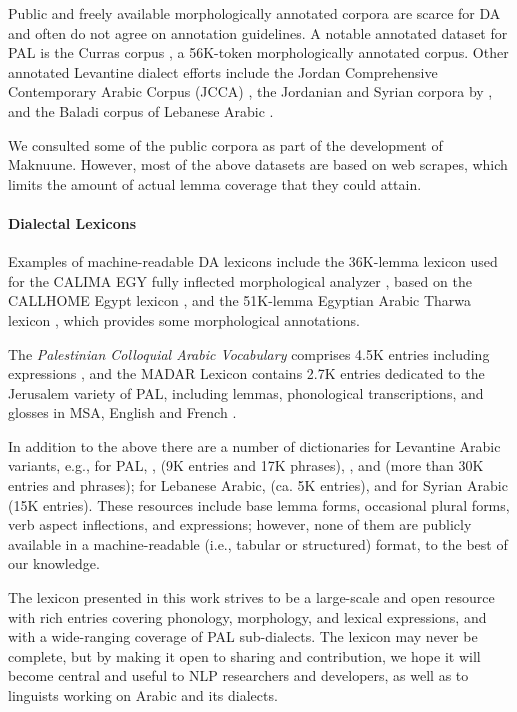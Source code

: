 Public and freely available morphologically annotated corpora are scarce for DA and often do not agree on annotation guidelines. A notable annotated dataset for PAL is the Curras corpus \citep{Jarrar:2016:curras}, a 56K-token morphologically annotated corpus. 
%
Other annotated  Levantine dialect efforts include the Jordan Comprehensive Contemporary Arabic Corpus (JCCA)
\citep{Sawalha:2019:construction}, the Jordanian and Syrian corpora by \citep{alshargi:2019:morphologically}, and the
Baladi corpus of Lebanese Arabic \citep{alhaff-EtAl:2022:LREC}.

We consulted some of the public corpora as part of the development of Maknuune. However, most of the above datasets are based on web scrapes, which limits the amount of actual lemma coverage that they could attain.


\paragraph{Dialectal Lexicons} 
Examples of machine-readable DA lexicons include the 36K-lemma lexicon used for the CALIMA EGY fully inflected morphological analyzer \citep{Habash:2012:morphological}, based on the CALLHOME Egypt lexicon \citep{Gadalla:1997:callhome}, and the 51K-lemma Egyptian Arabic Tharwa lexicon  \citep{Diab:2014:tharwa}, which provides some morphological annotations.

The \textit{Palestinian Colloquial Arabic Vocabulary} comprises 4.5K entries including expressions \citep{younis2021palestinian}, and  the MADAR Lexicon contains 2.7K entries dedicated to the Jerusalem variety of PAL, including lemmas, phonological transcriptions, and glosses in MSA, English and French \citep{Bouamor:2018:madar}.

In addition to the above there are a number of dictionaries for Levantine Arabic variants, e.g., for PAL, 
\citet{barghouti2001palestinian}, \citet{elihai2004olive} (9K entries and 17K phrases), \citet{moin2019etymological}, and \citet{seeger2022dictionary} (more than 30K entries and phrases); for Lebanese Arabic, \citet{freiha:1973:dictionary} (ca. 5K entries), and for Syrian Arabic \citet{stowasser2004dictionary} (15K entries).
These resources include  base lemma forms, occasional plural forms, verb aspect inflections, and expressions; however,
none of them are publicly available in a machine-readable (i.e., tabular or structured) format, to the best of our knowledge.

%
The lexicon presented in this work strives to be a large-scale and open resource with rich entries covering  phonology, morphology, and lexical expressions, and with a wide-ranging coverage of PAL sub-dialects. The lexicon may never be complete, but by making it open to sharing and contribution, we hope it will become central and useful to NLP researchers and developers, as well as to linguists working on Arabic and its dialects.

